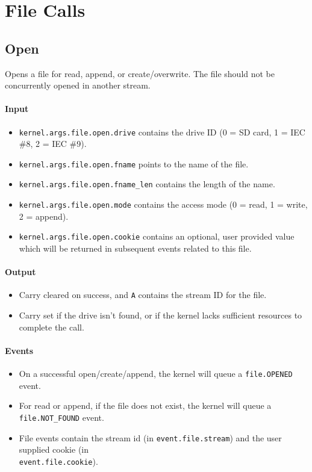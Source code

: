 \section*{File Calls}

\subsection*{Open}
Opens a file for read, append, or create/overwrite.  The file should not be concurrently opened in another stream.

\paragraph{Input}
\begin{itemize}
\item \verb+kernel.args.file.open.drive+ contains the drive ID (0 = SD card, 1 = IEC \#8, 2 = IEC \#9).
\item \verb+kernel.args.file.open.fname+ points to the name of the file.
\item \verb+kernel.args.file.open.fname_len+ contains the length of the name.
\item \verb+kernel.args.file.open.mode+ contains the access mode (0 = read, 1 = write, 2 = append). 
\item \verb+kernel.args.file.open.cookie+ contains an optional, user provided value which will be returned in subsequent events related to this file.
\end{itemize}

\paragraph{Output}
\begin{itemize}
\item Carry cleared on success, and \verb+A+ contains the stream ID for the file.
\item Carry set if the drive isn't found, or if the kernel lacks sufficient resources to complete the call.
\end{itemize}

\paragraph{Events}
\begin{itemize}
\item On a successful open/create/append, the kernel will queue a \verb+file.OPENED+ event.
\item For read or append, if the file does not exist, the kernel will queue a \verb+file.NOT_FOUND+ event.
\item File events contain the stream id (in \verb+event.file.stream+) and the user supplied cookie (in\\ \verb+event.file.cookie+).
\end{itemize}

